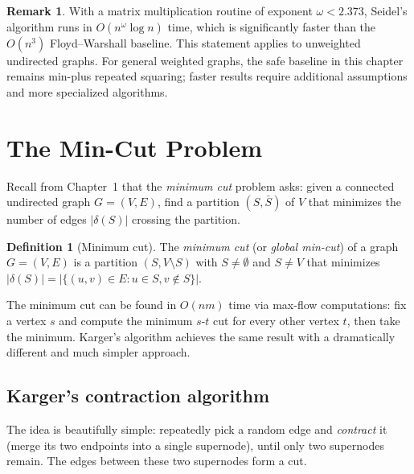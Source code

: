 \documentclass[twoside,12pt]{book}
\theoremstyle{plain}
\theoremstyle{definition}
\newtheorem{definition}[theorem]{Definition}
\newtheorem{remark}[theorem]{Remark}
\theoremstyle{remark}
\begin{document}
\begin{remark}
With a matrix multiplication routine of exponent $\omega<2.373$, Seidel's
algorithm runs in $O(n^{\omega}\log n)$ time, which is significantly faster
than the $O(n^3)$ Floyd--Warshall baseline. This statement applies to
unweighted undirected graphs. For general weighted graphs, the safe baseline
in this chapter remains min-plus repeated squaring; faster results require
additional assumptions and more specialized algorithms.
\end{remark}



\section{The Min-Cut Problem}
\label{sec:min-cut}

Recall from Chapter~1 that the \emph{minimum cut} problem asks: given a connected undirected graph $G = (V, E)$, find a partition $(S, \bar{S})$ of $V$ that minimizes the number of edges $|\delta(S)|$ crossing the partition.

\begin{definition}[Minimum cut]
The \emph{minimum cut} (or \emph{global min-cut}) of a graph $G = (V, E)$ is a partition $(S, V \setminus S)$ with $S \neq \emptyset$ and $S \neq V$ that minimizes $|\delta(S)| = |\{(u,v) \in E : u \in S, v \notin S\}|$.
\end{definition}

The minimum cut can be found in $O(nm)$ time via max-flow computations: fix a vertex $s$ and compute the minimum $s$-$t$ cut for every other vertex $t$, then take the minimum. Karger's algorithm achieves the same result with a dramatically different and much simpler approach.

\subsection{Karger's contraction algorithm}

The idea is beautifully simple: repeatedly pick a random edge and \emph{contract} it (merge its two endpoints into a single supernode), until only two supernodes remain. The edges between these two supernodes form a cut.
\end{document}
